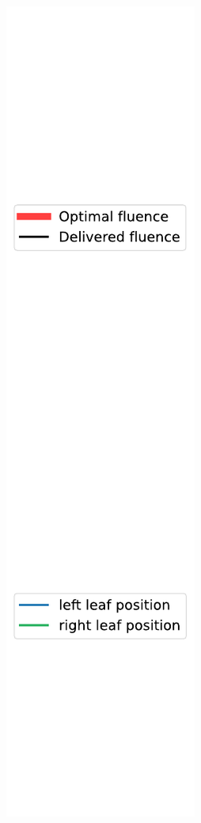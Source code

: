 \begin{figure}
\begin{subfigure}[b]{0.17\textwidth}
		\includegraphics[width=\linewidth]{_fluence_leaf_sequencing_legend.pdf}

\end{subfigure}
\end{figure}
